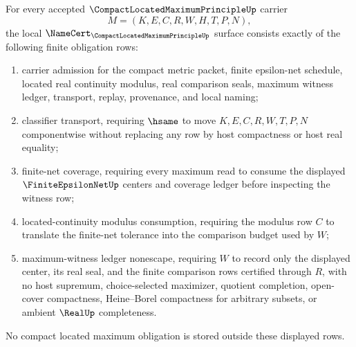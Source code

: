 \begin{theorem}
\label{thm:compact-located-maximum-principle-namecert-obligations}
For every accepted $\CompactLocatedMaximumPrincipleUp$ carrier
$$
M=(K,E,C,R,W,H,T,P,N),
$$
the local $\NameCert_{\CompactLocatedMaximumPrincipleUp}$ surface consists exactly of the following finite obligation rows:
\begin{enumerate}
\item carrier admission for the compact metric packet, finite epsilon-net schedule, located real continuity modulus, real comparison seals, maximum witness ledger, transport, replay, provenance, and local naming;
\item classifier transport, requiring $\hsame$ to move $K,E,C,R,W,T,P,N$ componentwise without replacing any row by host compactness or host real equality;
\item finite-net coverage, requiring every maximum read to consume the displayed $\FiniteEpsilonNetUp$ centers and coverage ledger before inspecting the witness row;
\item located-continuity modulus consumption, requiring the modulus row $C$ to translate the finite-net tolerance into the comparison budget used by $W$;
\item maximum-witness ledger nonescape, requiring $W$ to record only the displayed center, its real seal, and the finite comparison rows certified through $R$, with no host supremum, choice-selected maximizer, quotient completion, open-cover compactness, Heine--Borel compactness for arbitrary subsets, or ambient $\RealUp$ completeness.
\end{enumerate}
No compact located maximum obligation is stored outside these displayed rows.
\end{theorem}
